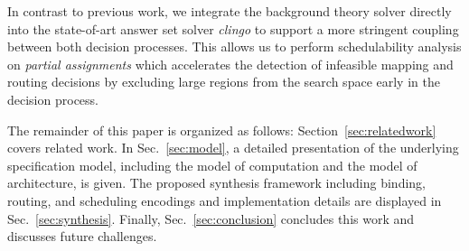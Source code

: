 \par In contrast to previous work, we integrate the background theory solver directly into the state-of-art answer set solver \emph{clingo} \cite{gekakaosscwa16a} to support a more stringent coupling between both decision processes. This allows us to perform schedulability analysis on \emph{partial assignments} which accelerates the detection of infeasible mapping and routing decisions by excluding large regions from the search space early in the decision process.%
\par The remainder of this paper is organized as follows: Section~\ref{sec:relatedwork} covers related work. 
In Sec.~\ref{sec:model}, a detailed presentation of the underlying specification model, including the model of computation and the model of architecture, is given. 
The proposed synthesis framework including binding, routing, and scheduling encodings and implementation details are displayed  in Sec.~\ref{sec:synthesis}. 
Finally, Sec.~\ref{sec:conclusion} concludes this work and discusses future challenges. 